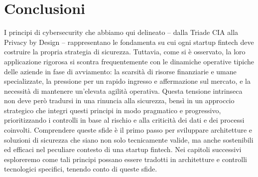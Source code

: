 \section{Conclusioni}
I principi di cybersecurity che abbiamo qui delineato – dalla Triade CIA alla Privacy by Design – rappresentano le fondamenta su cui ogni startup fintech deve costruire la propria strategia di sicurezza. Tuttavia, come si è osservato, la loro applicazione rigorosa si scontra frequentemente con le dinamiche operative tipiche delle aziende in fase di avviamento: la scarsità di risorse finanziarie e umane specializzate, la pressione per un rapido ingresso e affermazione sul mercato, e la necessità di mantenere un'elevata agilità operativa.
Questa tensione intrinseca non deve però tradursi in una rinuncia alla sicurezza, bensì in un approccio strategico che integri questi principi in modo pragmatico e progressivo, prioritizzando i controlli in base al rischio e alla criticità dei dati e dei processi coinvolti. Comprendere queste sfide è il primo passo per sviluppare architetture e soluzioni di sicurezza che siano non solo tecnicamente valide, ma anche sostenibili ed efficaci nel peculiare contesto di una startup fintech. Nei capitoli successivi esploreremo come tali principi possano essere tradotti in architetture e controlli tecnologici specifici, tenendo conto di queste sfide.